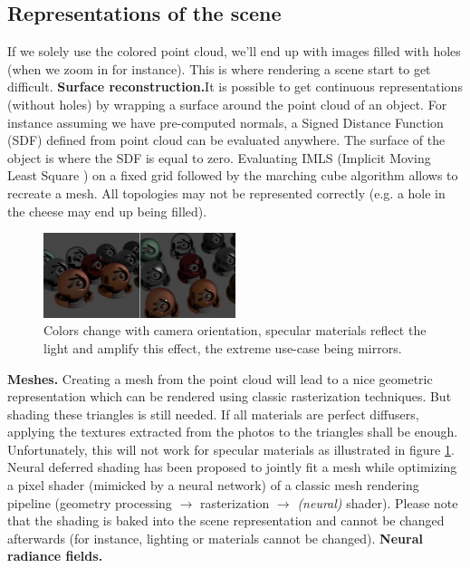 \subsection*{Representations of the scene}
\label{sec:representations}

If we solely use the colored point cloud, we'll end up with images filled with holes (when we zoom in for instance).
This is where rendering a scene start to get difficult. 
\noindent\textbf{Surface reconstruction.}It is possible to get continuous representations (without holes) by wrapping a surface around the point cloud of an object. For instance assuming we have pre-computed normals, a Signed Distance Function (SDF) defined from point cloud can be evaluated anywhere. The surface of the object is where the SDF is equal to zero. Evaluating IMLS (Implicit Moving Least Square \cite*{kolluri2008IMLS}) on a fixed grid followed by the marching cube algorithm allows to recreate a mesh. All topologies may not be represented correctly (e.g. a hole in the cheese may end up being filled).



\begin{figure}[htbp]
    \centering
    \includegraphics[width=0.5\textwidth]{figures/material_appearance_commented.png}
    \caption{Colors change with camera orientation, specular materials reflect the light and amplify this effect, the extreme use-case being mirrors.}
    \label{fig:material_changes}
\end{figure}

\noindent\textbf{Meshes.} Creating a mesh from the point cloud will lead to a nice geometric representation which can be rendered using classic rasterization techniques. But shading these triangles is still needed. If all materials are perfect diffusers, applying the textures extracted from the photos to the triangles shall be enough. Unfortunately, this will not work for specular materials as illustrated in figure \ref{fig:material_changes}. Neural deferred shading has been proposed \cite{worchel2022nds} to jointly fit a mesh while optimizing a pixel shader (mimicked by a neural network) of a classic mesh rendering pipeline (geometry processing $\rightarrow$ rasterization $\rightarrow$ \textit{(neural)} shader). Please note that the shading is baked into the scene representation and cannot be changed afterwards (for instance, lighting or materials cannot be changed).
\noindent\textbf{Neural radiance fields.} 

